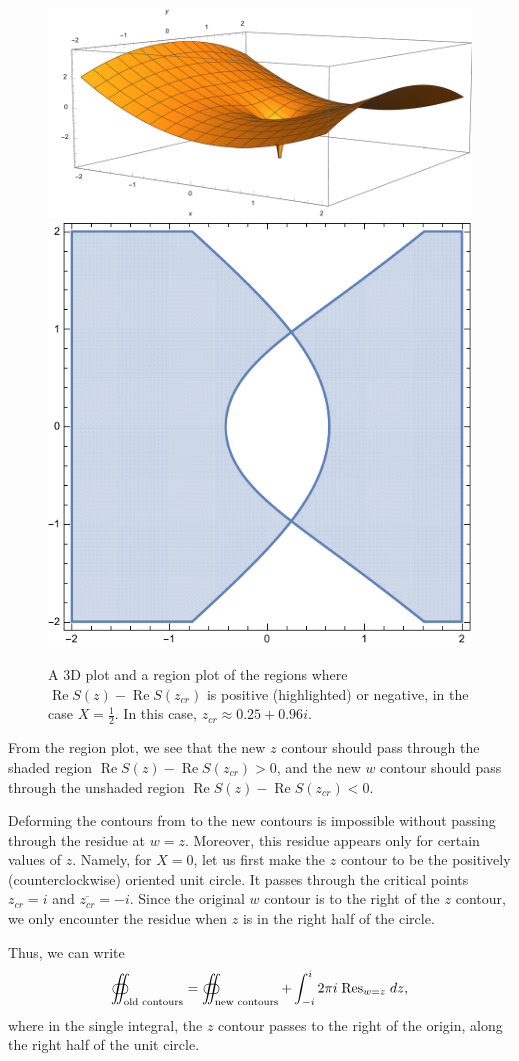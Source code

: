 \documentclass[letterpaper,11pt,oneside,reqno]{article}
\numberwithin{equation}{section}
\newcommand{\ssp}{\hspace{1pt}}
\theoremstyle{definition}
\begin{document}
\begin{figure}[htpb]
	\centering
	\includegraphics[height=.3\textwidth]{pictures/ReS_imaginary_3D.pdf}
	\qquad
	\includegraphics[height=.3\textwidth]{pictures/ReS_imaginary_region.pdf}
	\caption{A 3D plot and a region plot of the
	regions where $\operatorname{Re}S(z)-\operatorname{Re}S(z_{cr})$ is positive
	(highlighted) or negative, in the case $X=\frac{1}{2}$.
	In this case, $z_{cr}\approx 0.25+0.96 i$.}
	\label{fig:ReS_imaginary}
\end{figure}

From the region plot, we see that the new $z$ contour should
pass through the shaded region $\operatorname{Re}S(z)-\operatorname{Re}S(z_{cr})>0$,
and the new $w$ contour should pass through the unshaded region
$\operatorname{Re}S(z)-\operatorname{Re}S(z_{cr})<0$.

Deforming the contours from  to the new contours
is impossible without passing through the residue at $w=z$.
Moreover, this residue appears only for certain values of $z$. Namely, for $X=0$,
let us first make the $z$ contour to be the positively (counterclockwise) oriented
unit circle.
It passes through the critical points $z_{cr}=i$ and $\overline{z_{cr}}=-i$.
Since the original $w$ contour is to the right of the $z$ contour, we only
encounter the residue when $z$ is in the right half of the circle.

Thus, we can write
\begin{equation}
	\label{eq:K_n_bulk_deformation}
	\oiint_{\textnormal{old contours}}=
	\oiint_{\textnormal{new contours}}
	+
	\int_{-i}^i 2\pi i\ssp \operatorname{Res}\limits_{w=z}\ssp dz,
\end{equation}
where in the single integral, the $z$ contour passes to the right of the origin,
along the right half of the unit circle.
\end{document}
